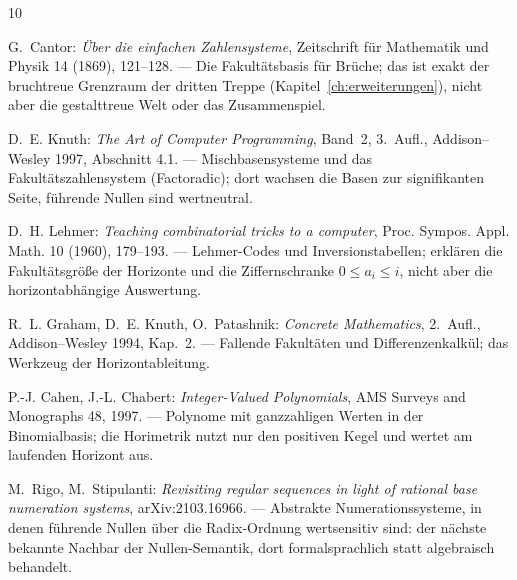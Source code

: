 \begingroup
\makeatletter
\renewcommand{\chapter}[2]{}%
\renewcommand{\@mkboth}[2]{}%
\makeatother
\begin{thebibliography}{10}

 G.~Cantor: \emph{Über die einfachen Zahlensysteme},
Zeitschrift für Mathematik und Physik 14 (1869), 121--128.
--- Die Fakultätsbasis für Brüche; das ist exakt der bruchtreue
Grenzraum der dritten Treppe (Kapitel~\ref{ch:erweiterungen}),
nicht aber die gestalttreue Welt oder das Zusammenspiel.

 D.~E. Knuth: \emph{The Art of Computer Programming},
Band~2, 3.~Aufl., Addison--Wesley 1997, Abschnitt 4.1.
--- Mischbasensysteme und das Fakultätszahlensystem (Factoradic);
dort wachsen die Basen zur signifikanten Seite, führende Nullen sind
wertneutral.

 D.~H. Lehmer: \emph{Teaching combinatorial tricks
to a computer}, Proc. Sympos. Appl. Math. 10 (1960), 179--193.
--- Lehmer-Codes und Inversionstabellen; erklären die
Fakultätsgröße der Horizonte und die Ziffernschranke $0\le a_i\le i$,
nicht aber die horizontabhängige Auswertung.

 R.~L. Graham, D.~E. Knuth, O.~Patashnik:
\emph{Concrete Mathematics}, 2.~Aufl., Addison--Wesley 1994, Kap.~2.
--- Fallende Fakultäten und Differenzenkalkül; das Werkzeug der
Horizontableitung.

 P.-J. Cahen, J.-L. Chabert: \emph{Integer-Valued
Polynomials}, AMS Surveys and Monographs 48, 1997.
--- Polynome mit ganzzahligen Werten in der Binomialbasis; die
Horimetrik nutzt nur den positiven Kegel und wertet am laufenden
Horizont aus.

 M.~Rigo, M.~Stipulanti: \emph{Revisiting regular
sequences in light of rational base numeration systems},
arXiv:2103.16966.
--- Abstrakte Numerationssysteme, in denen führende Nullen über die
Radix-Ordnung wertsensitiv sind: der nächste bekannte Nachbar der
Nullen-Semantik, dort formalsprachlich statt algebraisch behandelt.


\end{thebibliography}
